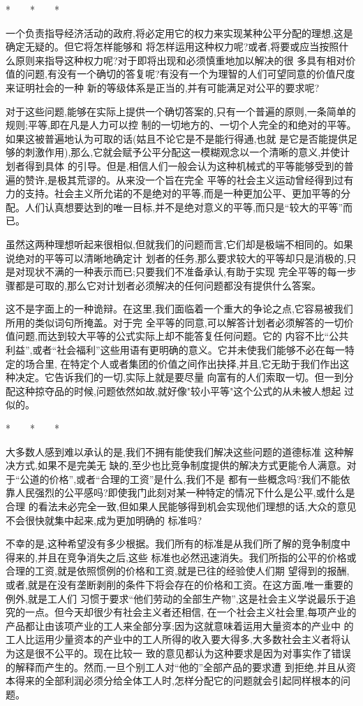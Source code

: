 ﻿\documentclass[12pt]{article}
\begin{document}
*　　*　　*

一个负责指导经济活动的政府,将必定用它的权力来实现某种公平分配的理想,这是确定无疑的。但它将怎样能够和
将怎样运用这种权力呢?或者,将要或应当按照什么原则来指导这种权力呢?对于即将出现和必须慎重地加以解决的很
多具有相对价值的问题,有没有一个确切的答复呢?有没有一个为理智的人们可望同意的价值尺度来证明社会的一种
新的等级体系是正当的,并有可能满足对公平的要求呢?

对于这些问题,能够在实际上提供一个确切答案的,只有一个普遍的原则,一条简单的规则;平等,即在凡是人力可以控
制的一切地方的、一切个人完全的和绝对的平等。如果这被普遍地认为可取的话(姑且不论它是不是能行得通,也就
是它是否能提供足够的刺激作用),那么,它就会赋予公平分配这一模糊观念以一个清晰的意义,并使计划者得到具体
的引导。但是,相信人们一般会认为这种机械式的平等能够受到的普遍的赞许,是极其荒谬的。从来没一个旨在完全
平等的社会主义运动曾经得到过有力的支持。社会主义所允诺的不是绝对的平等,而是一种更加公平、更加平等的分
配。人们认真想要达到的唯一目标,并不是绝对意义的平等,而只是``较大的平等''而已。

虽然这两种理想听起来很相似,但就我们的问题而言,它们却是极端不相同的。如果说绝对的平等可以清晰地确定计
划者的任务,那么要求较大的平等却只是消极的,只是对现状不满的一种表示而已;只要我们不准备承认,有助于实现
完全平等的每一步骤都是可取的,那么它对计划者必须解决的任何问题都没有提供什么答案。

这不是字面上的一种诡辩。在这里,我们面临着一个重大的争论之点,它容易被我们所用的类似词句所掩盖。对于完
全平等的同意,可以解答计划者必须解答的一切价值问题,而达到较大平等的公式实际上却不能答复任何问题。它的
内容不比``公共利益'',或者``社会福利''这些用语有更明确的意义。它并未使我们能够不必在每一特定的场合里,
在特定个人或者集团的价值之间作出抉择,并且,它无助于我们作出这种决定。它告诉我们的一切,实际上就是要尽量
向富有的人们索取一切。但一到分配这种掠夺品的时候,问题依然如故,就好像"较小平等"这个公式的从未被人想起
过似的。

*　　*　　*

大多数人感到难以承认的是,我们不拥有能使我们解决这些问题的道德标准 \myrule 这种解决方式,如果不是完美无
缺的,至少也比竞争制度提供的解决方式更能令人满意。对于``公道的价格'',或者``合理的工资''是什么,我们不是
都有一些概念吗?我们不能依靠人民强烈的公平感吗?即使我门此刻对某一种特定的情况下什么是公平,或什么是合理
的看法未必完全一致,但如果人民能够得到机会实现他们理想的话,大众的意见不会很快就集中起来,成为更加明确的
标准吗?

不幸的是,这种希望没有多少根据。我们所有的标准是从我们所了解的竞争制度中得来的,并且在竞争消失之后,这些
标准也必然迅速消失。我们所指的公平的价格或合理的工资,就是依照惯例的价格和工资,就是已往的经验使人们期
望得到的报酬,或者,就是在没有垄断剥削的条件下将会存在的价格和工资。在这方面,唯一重要的例外,就是工人们
习惯于要求``他们劳动的全部生产物'',这是社会主义学说最乐于追究的一点。但今天却很少有社会主义者还相信,
在一个社会主义社会里,每项产业的产品都让由该项产业的工人来全部分享;因为这就意味着运用大量资本的产业中
的工人比运用少量资本的产业中的工人所得的收入要大得多,大多数社会主义者将认为这是很不公平的。现在比较一
致的意见都认为这种要求是因为对事实作了错误的解释而产生的。然而,一旦个别工人对``他的''全部产品的要求遭
到拒绝,并且从资本得来的全部利润必须分给全体工人时,怎样分配它的问题就会引起同样根本的问题。
\end{document}
